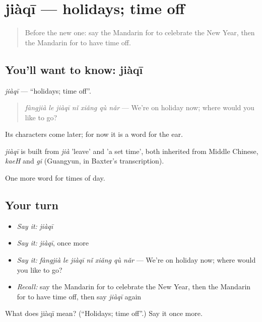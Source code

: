\section[jiàqī]{jiàqī — holidays; time off}

\label{lesson:ZH-C137-jiaqi}



\begin{quote}
Before the new one: say the Mandarin for to celebrate the New Year, then the Mandarin for to have time off.
\end{quote}

\subsection*{You'll want to know: jiàqī}
\emph{jiàqī} — \textquotedblleft{}holidays; time off\textquotedblright{}.

\begin{quote}
\emph{fàngjià le jiàqī nǐ xiǎng qù nǎr} — We're on holiday now; where would you like to go?
\end{quote}

Its characters come later; for now it is a word for the ear.

\begin{cousinweb}
\emph{jiàqī} is built from \emph{jià} 'leave' and  'a set time', both inherited from Middle Chinese, \emph{kaeH} and \emph{gi} (Guangyun, in Baxter's transcription).
\end{cousinweb}

\begin{grammarlens}[title={What you've built}]
One more word for times of day.
\end{grammarlens}

\subsection*{Your turn}
\begin{itemize}
\raggedright
  \item \emph{Say it:} \emph{jiàqī}
  \item \emph{Say it:} \emph{jiàqī}, once more
  \item \emph{Say it:} \emph{fàngjià le jiàqī nǐ xiǎng qù nǎr} — We're on holiday now; where would you like to go?
  \item \emph{Recall:} say the Mandarin for to celebrate the New Year, then the Mandarin for to have time off, then say \emph{jiàqī} again
\end{itemize}

\begin{tcolorbox}[breakable,colback=teal!4,colframe=teal!35!black,title={Before you move on}]
What does jiàqī mean? (\textquotedblleft{}Holidays; time off\textquotedblright{}.) Say it once more.
\end{tcolorbox}
